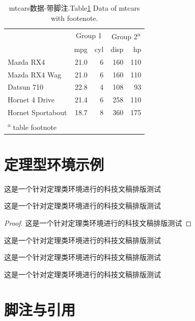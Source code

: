 \documentclass[12pt,a4paper,zihao=-4,UTF8]{book}
\begin{document}
\begin{table}[t]

\caption{\label{tab:unnamed-chunk-12}\label{tab:kable2}mtcars数据-带脚注.\protect\linebreak Table\ref{tab:kable2}  Data of mtcars with footenote.}
\centering
\begin{tabular}{l|r|r|r|r}
\hline
\multicolumn{1}{c|}{ } & \multicolumn{2}{c|}{Group 1} & \multicolumn{2}{c}{Group 2\textsuperscript{a}} \\
\cline{2-3} \cline{4-5}
  & mpg & cyl & disp & hp\\
\hline
Mazda RX4 & 21.0 & 6 & 160 & 110\\
\hline
Mazda RX4 Wag & 21.0 & 6 & 160 & 110\\
\hline
Datsun 710 & 22.8 & 4 & 108 & 93\\
\hline
Hornet 4 Drive & 21.4 & 6 & 258 & 110\\
\hline
Hornet Sportabout & 18.7 & 8 & 360 & 175\\
\hline
\multicolumn{5}{l}{\textsuperscript{a} table footnote}\\
\end{tabular}
\end{table}

\newcommand{\bbb}{这是一个针对定理类环境进行的科技文稿排版测试}

\section{定理型环境示例}

\begin{definition} 
\bbb
\end{definition}

\begin{theorem}\label{th1}
 \bbb
\end{theorem}

\begin{proof}
\bbb
\end{proof}

\begin{corollary}\label{cor1}
\bbb
\end{corollary}

\begin{lemma}\label{lem1}
\bbb
\end{lemma}

\begin{example}
\bbb
\end{example}

\section{脚注与引用}
\end{document}
